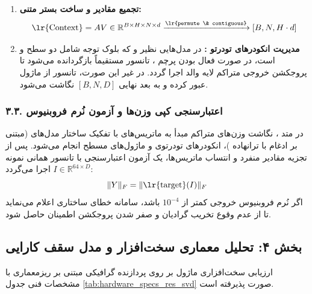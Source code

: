 \begin{enumerate}
\begin{equation}
    A = \operatorname{Softmax}(S, \dim=-1) \in \mathbb{R}^{B \times H \times N \times N}
    \end{equation}
    برای جلوگیری از انتشار خطاهای عددی در رژیم ممیز شناور، از دستور  و لایه  استفاده می‌شود.
    \item \textbf{تجمیع مقادیر و ساخت بستر متنی:}
    \begin{equation}
    \text{\lr{Context}} = A V \in \mathbb{R}^{B \times H \times N \times d} \xrightarrow{\text{\lr{permute \& contiguous}}} [B, N, H \cdot d]
    \end{equation}
    \item \textbf{مدیریت انکودرهای تودرتو :} در مدل‌هایی نظیر  و  که بلوک توجه شامل دو سطح  و  است، در صورت فعال بودن پرچم ، تانسور  مستقیماً بازگردانده می‌شود تا پروجکشن خروجی متراکم لایه والد اجرا گردد. در غیر این صورت، تانسور از ماژول  عبور کرده و به بعد نهایی $[B, N, D]$ نگاشت می‌شود.
\end{enumerate}

\subsubsection*{۳.۳. اعتبارسنجی کپی وزن‌ها و آزمون نُرم فروبنیوس}
در متد ، نگاشت وزن‌های متراکم مبدأ به ماتریس‌های  با تفکیک ساختار مدل‌های  (مبتنی بر ادغام  با ترانهاده )، انکودرهای تودرتوی  و ماژول‌های مسطح  انجام می‌شود. پس از تجزیه مقادیر منفرد و انتساب ماتریس‌ها، یک آزمون اعتبارسنجی با تانسور همانی نمونه $I \in \mathbb{R}^{64 \times D}$ اجرا می‌گردد:
\begin{equation}
\|Y\|_F = \|\text{\lr{target}}(I)\|_F
\end{equation}
اگر نُرم فروبنیوس خروجی کمتر از $10^{-4}$ باشد، سامانه خطای ساختاری اعلام می‌نماید تا از عدم وقوع تخریب گرادیان و صفر شدن پروجکشن اطمینان حاصل شود.

\subsection*{بخش ۴: تحلیل معماری سخت‌افزار و مدل سقف کارایی }
ارزیابی سخت‌افزاری ماژول  بر روی پردازنده گرافیکی  مبتنی بر ریزمعماری  با مشخصات فنی جدول \ref{tab:hardware_specs_res_svd} صورت پذیرفته است.

